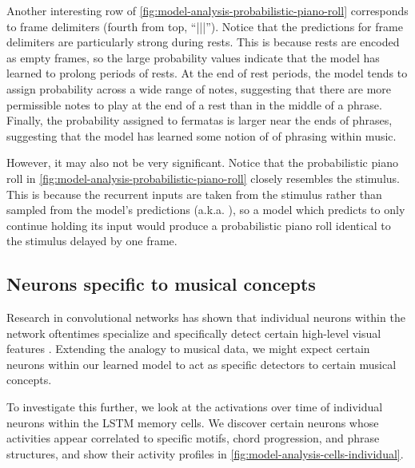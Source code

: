 Another interesting row of \cref{fig:model-analysis-probabilistic-piano-roll}
corresponds to frame delimiters (fourth from top, ``|||''). Notice that the
predictions for frame delimiters are particularly strong during rests. This is
because rests are encoded as empty frames, so the large probability values
indicate that the model has learned to prolong periods of rests. At the end of
rest periods, the model tends to assign probability across a wide range of
notes, suggesting that there are more permissible notes to play at the end of a
rest than in the middle of a phrase. Finally, the probability assigned to
fermatas is larger near the ends of phrases, suggesting that the model has
learned some notion of of phrasing within music.

However, it may also not be very significant. Notice that the probabilistic
piano roll in \cref{fig:model-analysis-probabilistic-piano-roll} closely
resembles the stimulus. This is because the recurrent inputs are taken from the
stimulus rather than sampled from the model's predictions (a.k.a.
\citep{williams1989learning}), so a model which predicts to only continue
holding its input would produce a probabilistic piano roll identical to the
stimulus delayed by one frame.

\subsection{Neurons specific to musical concepts}\label{sec:music-concept-neurons}

Research in convolutional networks has shown that individual neurons within the
network oftentimes specialize and specifically detect certain high-level visual
features \citep{zeiler2010deconvolutional}. Extending the analogy to musical
data, we might expect certain neurons within our learned model to act as
specific detectors to certain musical concepts.

To investigate this further, we look at the activations over time of individual
neurons within the LSTM memory cells. We discover certain neurons whose
activities appear correlated to specific motifs, chord progression, and phrase
structures, and show their activity profiles in
\cref{fig:model-analysis-cells-individual}.

